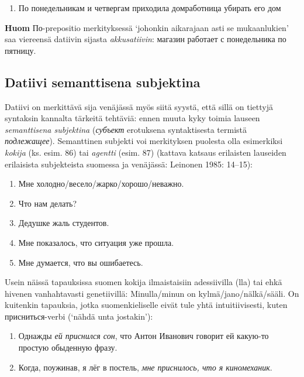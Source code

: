 \documentclass[]{scrreprt}
\providecommand{\tightlist}{%
  \setlength{\itemsep}{0pt}\setlength{\parskip}{0pt}}
\begin{document}
\begin{enumerate}
\def\labelenumi{(\arabic{enumi})}
\setcounter{enumi}{84}
\tightlist
\item
  По понедельникам и четвергам приходила домработница убирать его дом
\end{enumerate}

\textbf{Huom} По-prepositio merkityksessä `johonkin aikarajaan asti se
mukaanlukien' saa viereensä datiivin sijasta \emph{akkusatiivin}:
магазин работает с понедельника по пятницу.

\subsection{Datiivi semanttisena
subjektina}\label{datiivi-semanttisena-subjektina}

Datiivi on merkittävä sija venäjässä myös siitä syystä, että sillä on
tiettyjä syntaksin kannalta tärkeitä tehtäviä: ennen muuta kyky toimia
lauseen \emph{semanttisena subjektina} (\emph{субъект} erotuksena
syntaktisesta termistä \emph{подлежащее}). Semanttinen subjekti voi
merkityksen puolesta olla esimerkiksi \emph{kokija} (ks. esim. 86) tai
\emph{agentti} (esim. 87) (kattava katsaus erilaisten lauseiden
erilaisista subjekteista suomessa ja venäjässä: Leinonen 1985: 14--15):

\begin{enumerate}
\def\labelenumi{(\arabic{enumi})}
\setcounter{enumi}{85}
\tightlist
\item
  Мне холодно/весело/жарко/хорошо/неважно.
\item
  Что нам делать?
\item
  Дедушке жаль студентов.
\item
  Мне показалось, что ситуация уже прошла.
\item
  Мне думается, что вы ошибаетесь.
\end{enumerate}

Usein näissä tapauksissa suomen kokija ilmaistaisiin adessiivilla (lla)
tai ehkä hivenen vanhahtavasti genetiivillä: Minulla/minun on
kylmä/jano/nälkä/sääli. On kuitenkin tapauksia, jotka suomenkieliselle
eivät tule yhtä intuitiivisesti, kuten присниться-verbi (`nähdä unta
jostakin'):

\begin{enumerate}
\def\labelenumi{(\arabic{enumi})}
\setcounter{enumi}{90}
\tightlist
\item
  Однажды \emph{ей приснился сон}, что Антон Иванович говорит ей
  какую-то простую обыденную фразу.
\item
  Когда, поужинав, я лёг в постель, \emph{мне приснилось, что я
  киномеханик}.
\end{enumerate}
\end{document}

